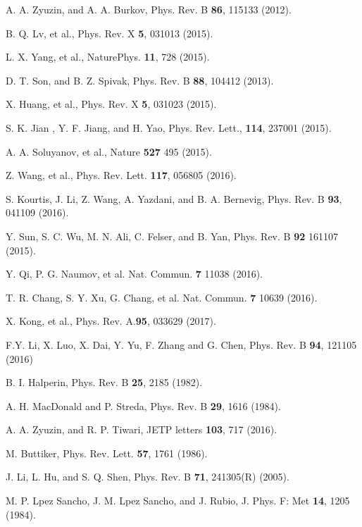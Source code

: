 \documentclass[twocolumn,superscriptaddress]{revtex4}%
\begin{document}
\begin{thebibliography}{99}
A. A. Zyuzin, and A. A. Burkov, Phys. Rev. B
\textbf{86}, 115133 (2012).

B. Q. Lv, et al., Phys. Rev. X \textbf{5}, 031013 (2015).

L. X. Yang, et al., NaturePhys. \textbf{11}, 728 (2015).

D. T. Son, and B. Z. Spivak, Phys. Rev. B \textbf{88},
104412 (2013).

X. Huang, et al., Phys. Rev. X \textbf{5}, 031023 (2015).

S. K. Jian , Y. F. Jiang, and H. Yao, Phys. Rev. Lett.,
\textbf{114}, 237001 (2015).

A. A. Soluyanov, et al., Nature \textbf{527} 495 (2015).

Z. Wang, et al., Phys. Rev. Lett. \textbf{117}, 056805 (2016).

S. Kourtis, J. Li, Z. Wang, A. Yazdani, and B. A.
Bernevig, Phys. Rev. B \textbf{93}, 041109 (2016).

Y. Sun, S. C. Wu, M. N. Ali, C. Felser, and B. Yan,
Phys. Rev. B \textbf{92} 161107 (2015).

Y. Qi, P. G. Naumov, et al. Nat. Commun. \textbf{7} 11038 (2016).

T. R. Chang, S. Y. Xu, G. Chang, et al. Nat. Commun.
\textbf{7} 10639 (2016).

X. Kong, et al., Phys. Rev. A.\textbf{95}, 033629 (2017).

F.Y. Li, X. Luo, X. Dai, Y. Yu, F. Zhang and G. Chen,
Phys. Rev. B \textbf{94}, 121105 (2016)

B. I. Halperin, Phys. Rev. B \textbf{25}, 2185 (1982).

A. H. MacDonald and P. Streda, Phys. Rev. B \textbf{29},
1616 (1984).

A. A. Zyuzin, and R. P. Tiwari, JETP letters
\textbf{103}, 717 (2016).

M. Buttiker, Phys. Rev. Lett. \textbf{57}, 1761 (1986).

J. Li, L. Hu, and S. Q. Shen, Phys. Rev. B \textbf{71},
241305(R) (2005).

M. P. Lpez Sancho, J. M. Lpez Sancho, and J. Rubio, J.
Phys. F: Met \textbf{14}, 1205 (1984).


\end{thebibliography}
\end{document}
